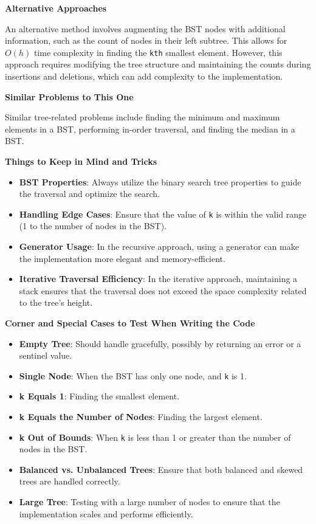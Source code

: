 \textbf{Alternative Approaches}

An alternative method involves augmenting the BST nodes with additional information, such as the count of nodes in their left subtree. This allows for \(O(h)\) time complexity in finding the \texttt{kth} smallest element. However, this approach requires modifying the tree structure and maintaining the counts during insertions and deletions, which can add complexity to the implementation.

\textbf{Similar Problems to This One}

Similar tree-related problems include finding the minimum and maximum elements in a BST, performing in-order traversal, and finding the median in a BST.

\textbf{Things to Keep in Mind and Tricks}

\begin{itemize}
    \item \textbf{BST Properties}: Always utilize the binary search tree properties to guide the traversal and optimize the search.
    \item \textbf{Handling Edge Cases}: Ensure that the value of \texttt{k} is within the valid range (1 to the number of nodes in the BST).
    \item \textbf{Generator Usage}: In the recursive approach, using a generator can make the implementation more elegant and memory-efficient.
    \item \textbf{Iterative Traversal Efficiency}: In the iterative approach, maintaining a stack ensures that the traversal does not exceed the space complexity related to the tree's height.
\end{itemize}

\textbf{Corner and Special Cases to Test When Writing the Code}

\begin{itemize}
    \item \textbf{Empty Tree}: Should handle gracefully, possibly by returning an error or a sentinel value.
    \item \textbf{Single Node}: When the BST has only one node, and \texttt{k} is 1.
    \item \textbf{k Equals 1}: Finding the smallest element.
    \item \textbf{k Equals the Number of Nodes}: Finding the largest element.
    \item \textbf{k Out of Bounds}: When \texttt{k} is less than 1 or greater than the number of nodes in the BST.
    \item \textbf{Balanced vs. Unbalanced Trees}: Ensure that both balanced and skewed trees are handled correctly.
    \item \textbf{Large Tree}: Testing with a large number of nodes to ensure that the implementation scales and performs efficiently.
\end{itemize}